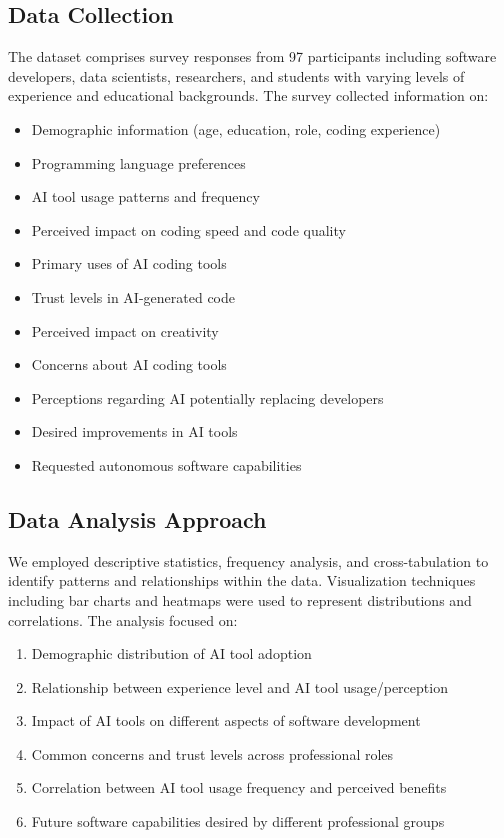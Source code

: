 \documentclass[conference]{IEEEtran}
\begin{document}
\subsection{Data Collection}
The dataset comprises survey responses from 97 participants including software developers, data scientists, researchers, and students with varying levels of experience and educational backgrounds. The survey collected information on:
\begin{itemize}
    \item Demographic information (age, education, role, coding experience)
    \item Programming language preferences
    \item AI tool usage patterns and frequency
    \item Perceived impact on coding speed and code quality
    \item Primary uses of AI coding tools
    \item Trust levels in AI-generated code
    \item Perceived impact on creativity
    \item Concerns about AI coding tools
    \item Perceptions regarding AI potentially replacing developers
    \item Desired improvements in AI tools
    \item Requested autonomous software capabilities
\end{itemize}

\subsection{Data Analysis Approach}
We employed descriptive statistics, frequency analysis, and cross-tabulation to identify patterns and relationships within the data. Visualization techniques including bar charts and heatmaps were used to represent distributions and correlations. The analysis focused on:

\begin{enumerate}
    \item Demographic distribution of AI tool adoption
    \item Relationship between experience level and AI tool usage/perception
    \item Impact of AI tools on different aspects of software development
    \item Common concerns and trust levels across professional roles
    \item Correlation between AI tool usage frequency and perceived benefits
    \item Future software capabilities desired by different professional groups
\end{enumerate}
\end{document}
